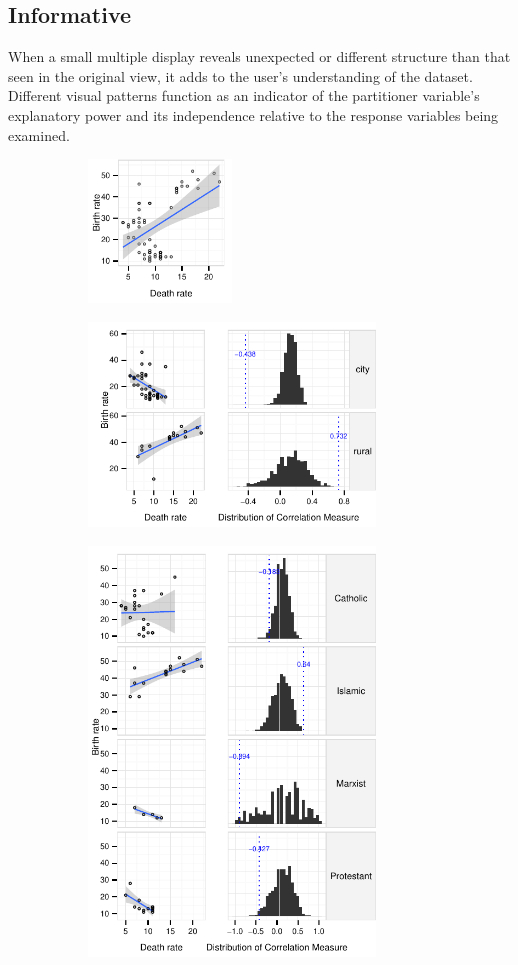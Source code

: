 \subsection{Informative}

When a small multiple display reveals unexpected or different structure than that seen in the original view, it adds to the user's understanding of the dataset. Different visual patterns function as an indicator of the partitioner variable's explanatory power and its independence relative to the response variables being examined.

\begin{figure}
 \centering 
	 \begin{subfigure}{1.5in}
		\includegraphics[width=1.5in]{images/DEATH_RT-BIRTH_RT.pdf}
		  \caption{}
		 \label{fig:informative_all}
	\end{subfigure}
	\begin{subfigure}{3in}
		\includegraphics[width=3in]{images/7_05653068514253-URBAN.pdf}
		 \label{fig:informative_sm}
		  \caption{}
	 \end{subfigure}
	\begin{subfigure}{3in}
		\includegraphics[width=3in]{images/2_56911395752061-LEADER.pdf}

\end{subfigure}
\end{figure}
